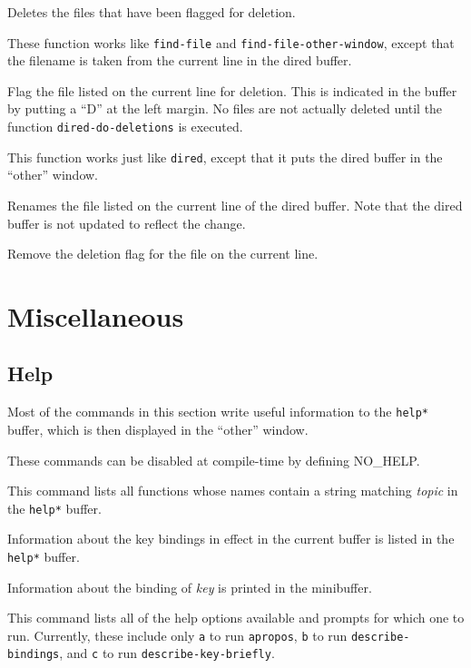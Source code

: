\fbody Deletes the files that have been flagged for deletion.

\fbody These function works like {\tt find-file} and 
{\tt find-file-other-window}, except that the filename is taken 
from the current line in the dired buffer.

\fbody Flag the file listed on the current line for deletion.  This is
indicated in the buffer by putting a ``D'' at the left margin.  No
files are not actually deleted until the function {\tt dired-do-deletions}
is executed.

\fbody This function works just like {\tt dired}, except that it puts the
dired buffer in the ``other'' window.

\fbody Renames the file listed on the current line of the dired buffer.  
Note that the dired buffer is not updated to reflect the change.

\fbody Remove the deletion flag for the file on the current line.

\chapter{Miscellaneous}

\section{Help}

Most of the commands in this section write useful information to the
{\tt *help*} buffer, which is then displayed in the ``other'' window.

These commands can be disabled at compile-time by defining NO\_HELP.

\fbody This command lists all functions whose names contain a string
matching {\em topic\/} in the {\tt *help*} buffer.

\fbody Information about the key bindings in effect in the current buffer
is listed in the {\tt *help*} buffer.

\fbody Information about the binding of {\em key\/} is printed in the
minibuffer.

\fbody This command lists all of the help options available and
prompts for which one to run.  Currently, these include only {\tt a}
to run {\tt apropos}, {\tt b} to run {\tt describe-bindings}, and {\tt c}
to run {\tt describe-key-briefly}.


